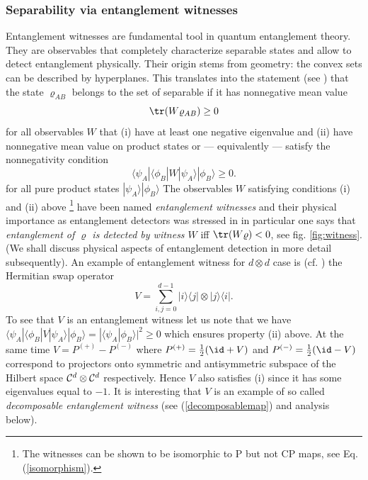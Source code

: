 \documentclass[rmp,12pt,preprint]{revtex4-2}
\begin{document}
\subsubsection{Separability via entanglement
witnesses\label{subsubsec:Witnesses}}

Entanglement witnesses \cite{sep1996,TerhalB} are fundamental tool in
quantum entanglement theory. They are observables that completely
characterize separable states and allow to detect entanglement
physically. Their origin stems from geometry: the convex sets can be
described by hyperplanes. This translates into the statement (see
\cite{sep1996,TerhalB}) that the state $\varrho_{AB}$ belongs to the
set of separable if it has nonnegative mean value
\begin{equation}
{\tr}(W\varrho_{AB} )\geq 0 \label{witnesscondition-v1}
\end{equation}
for all observables $W$ that (i) have at least one negative eigenvalue
and (ii) have nonnegative mean value on product states or ---
equivalently --- satisfy the nonnegativity condition
\begin{equation}
\langle \psi_{A}|\langle \phi_{B}| W
|\psi_{A}\rangle|\phi_{B}\rangle \geq 0. \label{witnesscondition-v2}
\end{equation}
for all pure product states $|\psi_{A}\rangle|\phi_{B}\rangle$ The
observables $W$ satisfying conditions (i) and (ii) above \footnote{The
  witnesses can be shown to be isomorphic to P but not CP maps, see
  Eq. (\ref{isomorphism}).} have been named {\it entanglement
  witnesses} and their physical importance as entanglement detectors
was stressed in \cite{TerhalB} in particular one says that
\emph{entanglement of $\varrho$ is detected by witness $W$} iff
${\tr}(W\varrho)<0$, see fig. \ref{fig:witness}.  (We shall discuss
physical aspects of entanglement detection in more detail
subsequently).  An example of entanglement witness for $d \otimes d$
case is (cf. \cite{Werner1989}) the Hermitian swap operator
\begin{equation}
V=\sum_{i,j=0}^{d-1}|i\rangle\langle j| \otimes |j\rangle\langle i|.
\label{swap}
\end{equation}
To see that $V$ is an entanglement witness let us note that we
have$\langle \psi_{A}|\langle \phi_{B}| V
|\psi_{A}\rangle|\phi_{B}\rangle= |\langle
\psi_{A}|\phi_{B}\rangle|^{2} \geq 0$ which ensures property (ii)
above. At the same time $V=P^{(+)} - P^{(-)}$ where $P^{(+)}={1\over 2}(\id + V)$ and
$P^{(-)}={1\over 2}(\id - V)$ correspond to projectors onto symmetric and antisymmetric
subspace of the Hilbert space ${\cal C}^{d} \otimes {\cal C}^{d}$
respectively.  Hence $V$ also satisfies (i) since it has some
eigenvalues equal to $-1$. It is interesting that $V$ is an example of
so called {\it decomposable entanglement witness} (see
(\ref{decomposablemap}) and analysis below).
\end{document}
